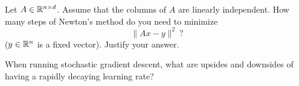 \documentclass[11pt,nocut]{article}
\begin{document}
\begin{problem}
	Let $A \in \mathbb{R}^{n \times d}$. Assume that the columns of $A$ are linearly independent. How many steps of Newton's method do you need to minimize
	$$
	\|Ax - y\|^2 \ ?
	$$
	($y \in \mathbb{R}^n$ is a fixed vector). Justify your answer.
\end{problem}


\begin{problem}
	When running stochastic gradient descent, what are upsides and downsides of having a rapidly decaying learning rate?
\end{problem}

\vspace{1cm}
\centerline{}

%
%
\end{document}
